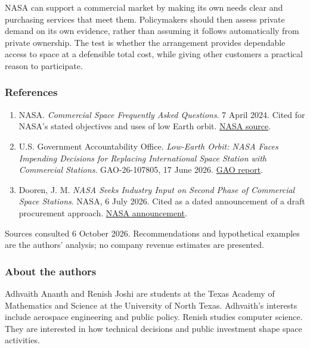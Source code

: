 \documentclass[11pt,letterpaper]{article}
\providecommand{\tightlist}{\setlength{\itemsep}{0pt}\setlength{\parskip}{0pt}}
\begin{document}
NASA can support a commercial market by making its own needs clear and
purchasing services that meet them. Policymakers should then assess
private demand on its own evidence, rather than assuming it follows
automatically from private ownership. The test is whether the
arrangement provides dependable access to space at a defensible total
cost, while giving other customers a practical reason to participate.

\hypertarget{references}{%
\subsubsection{References}\label{references}}

\begin{enumerate}
\def\labelenumi{\arabic{enumi}.}
\tightlist
\item
  NASA. \emph{Commercial Space Frequently Asked Questions}. 7 April
  2024. Cited for NASA's stated objectives and uses of low Earth orbit.
  \href{https://www.nasa.gov/humans-in-space/leo-economy-frequently-asked-questions/}{NASA
  source}.
\item
  U.S. Government Accountability Office. \emph{Low-Earth Orbit: NASA
  Faces Impending Decisions for Replacing International Space Station
  with Commercial Stations}. GAO-26-107805, 17 June 2026.
  \href{https://www.gao.gov/products/gao-26-107805}{GAO report}.
\item
  Dooren, J. M. \emph{NASA Seeks Industry Input on Second Phase of
  Commercial Space Stations}. NASA, 6 July 2026. Cited as a dated
  announcement of a draft procurement approach.
  \href{https://www.nasa.gov/humans-in-space/commercial-space/nasa-seeks-industry-input-on-second-phase-of-commercial-space-stations/}{NASA
  announcement}.
\end{enumerate}

Sources consulted 6 October 2026. Recommendations and hypothetical
examples are the authors' analysis; no company revenue estimates are
presented.

\hypertarget{about-the-authors}{%
\subsubsection{About the authors}\label{about-the-authors}}

Adhvaith Ananth and Renish Joshi are students at the Texas Academy of
Mathematics and Science at the University of North Texas. Adhvaith's
interests include aerospace engineering and public policy. Renish
studies computer science. They are interested in how technical decisions
and public investment shape space activities.
\end{document}
